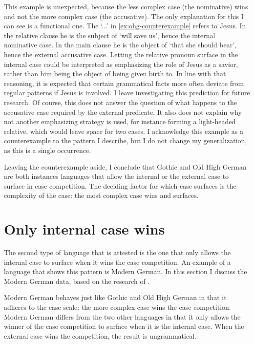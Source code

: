 This example is unexpected, because the less complex case (the nominative) wins and not the more complex case (the accusative).
The only explanation for this I can see is a functional one. The  `...' in \ref{ex:ohg-counterexample} refers to Jesus. In the relative clause he is the subject of  `will save us', hence the internal nominative case. In the main clause he is the object of  `that she should bear', hence the external accusative case.
Letting the relative pronoun surface in the internal case could be interpreted as emphasizing the role of Jesus as a savior, rather than him being the object of being given birth to. In line with that reasoning, it is expected that certain grammatical facts more often deviate from regular patterns if Jesus is involved. I leave investigating this prediction for future research.
Of course, this does not answer the question of what happens to the accusative case required by the external predicate. It also does not explain why not another emphasizing strategy is used, for instance forming a light-headed relative, which would leave space for two cases.
I acknowledge this example as a counterexample to the pattern I describe, but I do not change my generalization, as this is a single occurrence.

Leaving the counterexample aside, I conclude that Gothic and Old High German are both instances languages that allow the internal or the external case to surface in case competition. The deciding factor for which case surfaces is the complexity of the case: the most complex case wins and surfaces.


\section{Only internal case wins}

The second type of language that is attested is the one that only allows the internal case to surface when it wins the case competition. An example of a language that shows this pattern is Modern German. In this section I discuss the Modern German data, based on the research of \citet{vogel2001}.

Modern German behaves just like Gothic and Old High German in that it adheres to the case scale: the more complex case wins the case competition. Modern German differs from the two other languages in that it only allows the winner of the case competition to surface when it is the internal case. When the external case wins the competition, the result is ungrammatical.

